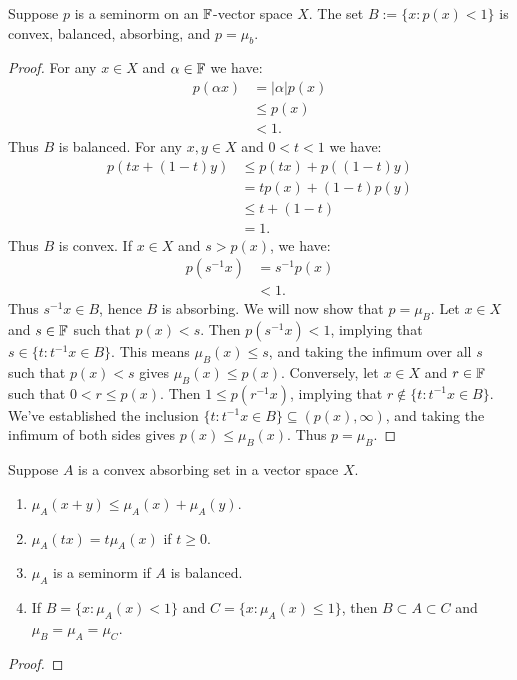 \begin{proposition}
	Suppose $p$ is a seminorm on an $\mathbb{F}$-vector space $X$. The set $B := \{x : p(x) < 1\}$ is convex, balanced, absorbing, and $p = \mu_b$.
\end{proposition}
	\begin{proof}
		For any $x \in X$ and $\alpha \in \mathbb{F}$ we have:
		\begin{align*}
			p(\alpha x) 
			& = |\alpha|p(x) \\
			&\leq p(x) \\ 
			& < 1.
		\end{align*}
		Thus $B$ is balanced. For any $x,y \in X$ and $0 < t < 1$ we have:
		\begin{align*}
			p(tx + (1-t)y)
			& \leq p(tx) + p((1-t)y) \\
			&= tp(x) + (1-t)p(y) \\
			&\leq t + (1-t)  \\
			&= 1.
		\end{align*}
		Thus $B$ is convex. If $x \in X$ and $s > p(x)$, we have:
		\begin{align*}
			p(s^{-1}x)
			&= s^{-1}p(x)\\
			&< 1.
		\end{align*}
		Thus $s^{-1}x \in B$, hence $B$ is absorbing. We will now show that $p = \mu_B$. Let $x \in X$ and $s \in \mathbb{F}$ such that $p(x) < s$. Then $p(s^{-1}x) < 1$, implying that $s \in \{t : t^{-1}x \in B\}$. This means $\mu_B(x) \leq s$, and taking the infimum over all $s$ such that $p(x) < s$ gives $\mu_B(x) \leq p(x)$. Conversely, let $x \in X$ and $r \in \mathbb{F}$ such that $0 < r \leq p(x)$. Then $1 \leq p(r^{-1}x)$, implying that $r \not\in \{t : t^{-1} x \in B\}$. We've established the inclusion $\{t:t^{-1}x \in B\} \subseteq (p(x),\infty)$, and taking the infimum of both sides gives $p(x) \leq \mu_B(x)$. Thus $p = \mu_B$.
	\end{proof}

\begin{theorem}
	Suppose $A$ is a convex absorbing set in a vector space $X$. 
	\mbox{}
	\begin{enumerate}[label = (\alph*),itemsep=1pt,topsep=3pt]
		\item $\mu_A(x+y) \leq \mu_A(x) + \mu_A(y)$.
		\item $\mu_A(tx) = t \mu_A(x)$ if $t \geq 0$.
		\item $\mu_A$ is a seminorm if $A$ is balanced.
		\item If $B = \{x : \mu_A(x) < 1\}$ and $C = \{x : \mu_A(x) \leq 1\}$, then $B \subset A \subset C$ and $\mu_B = \mu_A = \mu_C$.
	\end{enumerate}
\end{theorem}
	{\color{red}
	\begin{proof}
			
	\end{proof}}

